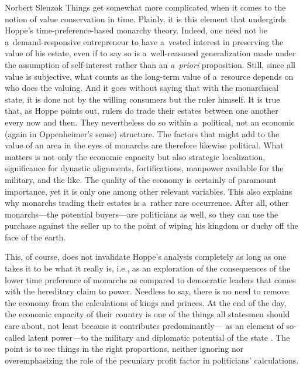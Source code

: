 \begin{artengenv}{Norbert Slenzok}
Things get somewhat more complicated when it comes to the notion of value conservation in time. Plainly, it is this element that undergirds Hoppe's time-preference-based monarchy theory. Indeed, one need not be a~demand-responsive entrepreneur to have a~vested interest in preserving the value of his estate, even if to say so is a~well-reasoned generalization made under the assumption of self-interest rather than an \textit{a~priori} proposition. Still, since all value is subjective, what counts as the long-term value of a~resource depends on who does the valuing. And it goes without saying that with the monarchical state, it is done not by the willing consumers but the ruler himself. It is true that, as Hoppe 
\parencite*[][p.18]{hoppe_democracy_2007} %
 points out, rulers do trade their estates between one another every now and then. They nevertheless do so within a~political, not an economic (again in Oppenheimer's sense) structure. The factors that might add to the value of an area in the eyes of monarchs are therefore likewise political. What matters is not only the economic capacity but also strategic localization, significance for dynastic alignments, fortifications, manpower available for the military, and the like. The quality of the economy is certainly of paramount importance, yet it is only one among other relevant variables. This also explains why monarchs trading their estates is a~rather rare occurrence. After all, other monarchs---the potential buyers---are politicians as well, so they can use the purchase against the seller up to the point of wiping his kingdom or duchy off the face of the earth.



This, of course, does not invalidate Hoppe's analysis completely as long as one takes it to be what it really is, i.e., as an exploration of the consequences of the lower time preference of monarchs as compared to democratic leaders that comes with the hereditary claim to power. Needless to say, there is no need to remove the economy from the calculations of kings and princes. At the end of the day, the economic capacity of their country is one of the things all statesmen should care about, not least because it contributes predominantly--- as an element of so-called latent power\textit{---}to the military and diplomatic potential of the state 
\parencite[][chap. 3]{mearsheimer_tragedy_2001}. %
 The point is to see things in the right proportions, neither ignoring nor overemphasizing the role of the pecuniary profit factor in politicians' calculations.




\end{artengenv}
